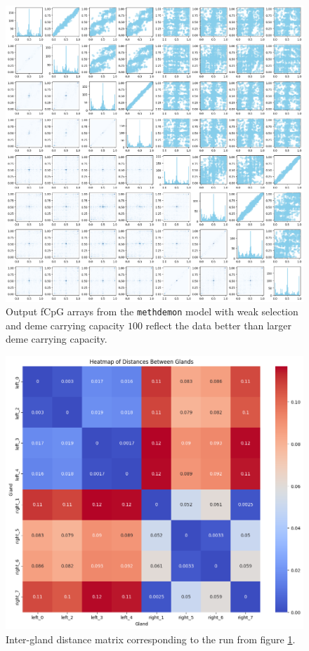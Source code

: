 \begin{figure}[h]
    \centering
    \includegraphics[width=\textwidth]{Chapter_5/figures/100plot.png}
    \caption{Output fCpG arrays from the \texttt{methdemon} model with weak
    selection and deme carrying capacity $100$ reflect the data better than
    larger deme carrying capacity.}
    \label{fig:methdemon_weak_selection_small}
\end{figure}

\begin{figure}[h]
    \centering
    \includegraphics[width=\textwidth]{Chapter_5/figures/100dist.png}
    \caption{Inter-gland distance matrix corresponding to the run from figure
    \ref{fig:methdemon_weak_selection_small}.}
    \label{fig:methdemon_weak_dist_small}
\end{figure}
\clearpage

